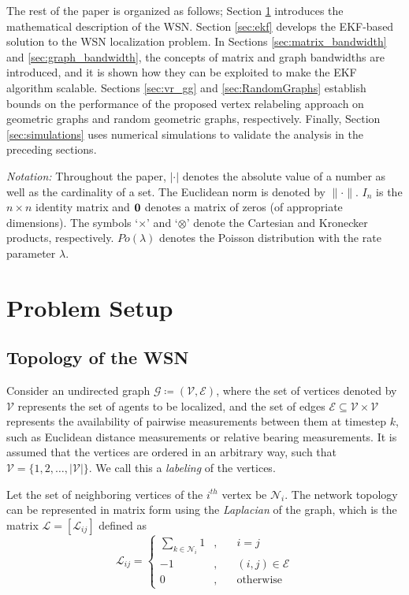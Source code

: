 \documentclass[twocolumn]{article}
\theoremstyle{plain}
\theoremstyle{definition}
\theoremstyle{definition}
\theoremstyle{remark}
\begin{document}
The rest of the paper is organized as follows; Section \ref{sec:problem} introduces the mathematical description of the WSN. Section \ref{sec:ekf} develops the EKF-based solution to the WSN localization problem. In Sections \ref{sec:matrix_bandwidth} and \ref{sec:graph_bandwidth}, the concepts of matrix and graph bandwidths are introduced, and it is shown how they can be exploited to make the EKF algorithm scalable. Sections \ref{sec:vr_gg} and \ref{sec:RandomGraphs} establish bounds on the performance of the proposed vertex relabeling approach on geometric graphs and random geometric graphs, respectively. Finally, Section \ref{sec:simulations} uses numerical simulations to validate the analysis in the preceding sections.

\textit{Notation:} Throughout the paper, $|\cdot|$ denotes the absolute value of a number as well as the cardinality of a set. The Euclidean norm is denoted by $\|\cdot\|$. $I_n$ is the $n\times n$ identity matrix and $\bold 0$ denotes a matrix of zeros (of appropriate dimensions). The symbols `$\times$' and `$\otimes$' denote the Cartesian and Kronecker products, respectively. $\textit{Po}(\lambda)$ denotes the Poisson distribution with the rate parameter $\lambda$.

\section{Problem Setup}
\label{sec:problem}

\subsection{Topology of the WSN}
Consider an undirected graph $\mathcal G \coloneqq (\mathcal V, \mathcal{E})$, where the set of vertices denoted by $\mathcal{V}$ represents the set of agents to be localized, and the set of edges $\mathcal E \subseteq \mathcal V \times \mathcal V$ represents the availability of pairwise measurements between them at timestep $k$, such as Euclidean distance measurements or relative bearing measurements. It is assumed that the vertices are ordered in an arbitrary way, such that $\mathcal V = \{1, 2, \dots , |\mathcal V|\}$. We call this a \textit{labeling} of the vertices.

Let the set of neighboring vertices of the $i^{th}$ vertex be $\mathcal N_i$. The network topology can be represented in matrix form using the \textit{Laplacian} of the graph, which is the matrix $\mathcal L = [\mathcal L_{ij}]$ defined as
\begin{equation}
\mathcal  L_{ij} = 
\left \{
\begin{aligned}
\sum_{k\in \mathcal N_i} 1&, \quad &  i=j\\
-1&,  & (i,j)\in \mathcal E \\
0&, & \textrm{otherwise}
\label{eq:laplacian}
\end{aligned}
\right.
\end{equation}
\end{document}
